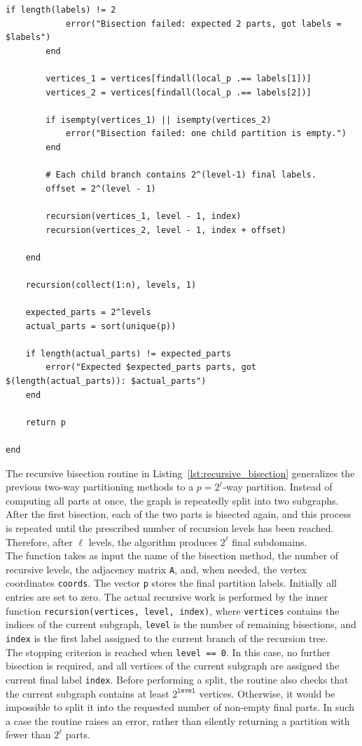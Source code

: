 \documentclass[unicode,10pt,a4paper,oneside,numbers=endperiod,openany]{scrartcl}
\begin{document}
\begin{lstlisting}[style=grayverbatim, caption={Recursive Bisection algorithm}, label={lst:recursive_bisection}]
        if length(labels) != 2
            error("Bisection failed: expected 2 parts, got labels = $labels")
        end

        vertices_1 = vertices[findall(local_p .== labels[1])]
        vertices_2 = vertices[findall(local_p .== labels[2])]

        if isempty(vertices_1) || isempty(vertices_2)
            error("Bisection failed: one child partition is empty.")
        end

        # Each child branch contains 2^(level-1) final labels.
        offset = 2^(level - 1)

        recursion(vertices_1, level - 1, index)
        recursion(vertices_2, level - 1, index + offset)

    end

    recursion(collect(1:n), levels, 1)

    expected_parts = 2^levels
    actual_parts = sort(unique(p))

    if length(actual_parts) != expected_parts
        error("Expected $expected_parts parts, got $(length(actual_parts)): $actual_parts")
    end

    return p

end
\end{lstlisting}
The recursive bisection routine in Listing~\ref{lst:recursive_bisection} generalizes the previous
two-way partitioning methods to a \(p=2^\ell\)-way partition. Instead of computing all parts at once,
the graph is repeatedly split into two subgraphs. After the first bisection, each of the two parts is
bisected again, and this process is repeated until the prescribed number of recursion levels has been
reached. Therefore, after \(\ell\) levels, the algorithm produces \(2^\ell\) final subdomains.\\

The function takes as input the name of the bisection method, the number of recursive levels, the
adjacency matrix \texttt{A}, and, when needed, the vertex coordinates \texttt{coords}. The vector
\texttt{p} stores the final partition labels. Initially all entries are set to zero. The actual recursive
work is performed by the inner function \texttt{recursion(vertices, level, index)}, where
\texttt{vertices} contains the indices of the current subgraph, \texttt{level} is the number of
remaining bisections, and \texttt{index} is the first label assigned to the current branch of the
recursion tree.\\

The stopping criterion is reached when \texttt{level == 0}. In this case, no further bisection is
required, and all vertices of the current subgraph are assigned the current final label
\texttt{index}. Before performing a split, the routine also checks that the current subgraph contains
at least \(2^{\texttt{level}}\) vertices. Otherwise, it would be impossible to split it into the requested
number of non-empty final parts. In such a case the routine raises an error, rather than silently
returning a partition with fewer than \(2^\ell\) parts.\\
\end{document}
